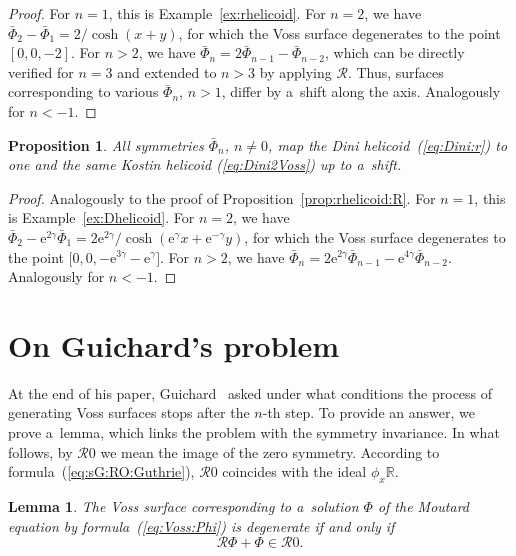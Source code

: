\documentclass[pdftex]{sigma}
\def\eqref#1{{\rm(\ref{#1})}}
\def\RR{{\mathbb R}}
\def\RO{{\mathcal R}}
\numberwithin{equation}{section}
\newtheorem{Lemma}[Theorem]{Lemma}
\newtheorem{Proposition}[Theorem]{Proposition}
\theoremstyle{definition}
\begin{document}
\begin{proof}
For $n = 1$, this is Example~\ref{ex:rhelicoid}.
For $n = 2$, we have
$\bar\Phi_{2} - \bar\Phi_1 = 2/{\cosh(x + y)}$,
for which the Voss surface degenerates to the point $[0,0,-2]$.
For $n > 2$, we have $\bar\Phi_n = 2\bar\Phi_{n-1} - \bar\Phi_{n-2}$,
which can be directly verified for $n = 3$
and extended to $n > 3$ by applying $\RO$.
Thus, surfaces corresponding to various
$\bar\Phi_n$, $n > 1$, differ by a~shift along the axis.
Analogously for $n < -1$. \hglue -1pc \null
\end{proof}



\begin{Proposition} \label{prop:Dhelicoid:R}
All symmetries $\bar\Phi_n$, $n \ne 0$, map the Dini
helicoid~\eqref{eq:Dini:r} to one and the same Kostin helicoid
\eqref{eq:Dini2Voss} up to a~shift.
\end{Proposition}

\begin{proof}
Analogously to the proof of Proposition~\ref{prop:rhelicoid:R}.
For $n = 1$, this is Example~\ref{ex:Dhelicoid}.
For $n = 2$, we have
$\bar\Phi_{2} - \mathrm{e}^{2\gamma} \bar\Phi_1
 = 2 \mathrm{e}^{2 \gamma}/{\cosh(\mathrm{e}^\gamma x +\mathrm{e}^{-\gamma} y)}$,
for which the Voss surface degenerates to the point
$\big[0,0,-\mathrm{e}^{3 \gamma} - \mathrm{e}^{\gamma}\big]$.
For $n > 2$, we have
$\bar\Phi_n = 2 \mathrm{e}^{2 \gamma} \bar\Phi_{n-1}
 - \mathrm{e}^{4 \gamma}\bar\Phi_{n-2}$.
Analogously for $n < -1$.
\end{proof}

\section{On Guichard's problem}
\label{sect:GP}

At the end of his paper, Guichard~\cite{CG-1890b} asked under what
conditions the process of generating Voss surfaces stops after the
$n$-th step.
To provide an answer, we prove a~lemma, which links the problem with the
symmetry invariance.
In what follows, by $\RO 0$ we mean the image of the zero symmetry.
According to formula~\eqref{eq:sG:RO:Guthrie},
$\RO 0$ coincides with the ideal $\phi_x \RR$.

\begin{Lemma} \label{lemma1}
The Voss surface corresponding to a~solution $\Phi$ of the
Moutard equation by formula~\eqref{eq:Voss:Phi} is degenerate if and only if
\begin{equation}
\label{eq:degen:RO:1}
\RO\Phi + \Phi \in \RO 0.
\end{equation}
\end{Lemma}
\end{document}
